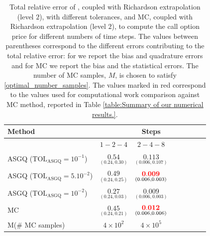 \begin{table}[!h]
	\centering
	\begin{tabular}{l*{6}{c}r}
		\toprule[1.5pt]
	Method & & Steps  & &     \\
	\hline
		        & $1-2-4$ & $2-4-8$  \\
		\hline

		ASGQ ($\text{TOL}_{\text{ASGQ}}=10^{-1}$)  & $\underset{(0.24,0.30)}{\mathbf{ 0.54
		}}$ & $\underset{(0.006,0.107)}{\mathbf{ 0.113}}$ \\
		ASGQ ($\text{TOL}_{\text{ASGQ}}=5.10^{-2}$)  & $\underset{(0.24,0.25)}{\mathbf{   0.49
		}}$ & $\underset{(0.006,0.003)}{\mathbf{ {\color{red}0.009}} }$  \\
		ASGQ ($\text{TOL}_{\text{ASGQ}}=10^{-2}$)  & $\underset{(0.24,0.03)}{\mathbf{ 0.27}}$ & $\underset{(0.006,0.003)}{\mathbf{ 0.009 }}$    \\	

			
				\hline
		MC   & $\underset{(0.24,0.21)}{\mathbf{0.45}}$  & $\underset{(0.006,0.006)}{\mathbf{{\color{red}0.012}}}$    \\
			M(\# MC samples) & $4 \times 10^2$  & $4 \times 10^5$   \\
		\bottomrule[1.25pt]
	\end{tabular}
	\caption{Total relative  error of , coupled with Richardson extrapolation (level $2$), with different tolerances, and MC, coupled with Richardson extrapolation (level $2$), to compute the call option price for different numbers of time steps.  The values between parentheses correspond to the different errors contributing to the total relative error: for  we report the bias and quadrature errors and for MC we report the bias and the statistical errors. The number of MC samples, $M$, is chosen to satisfy \eqref{optimal_number_samples}. The values marked in red correspond to the values used for computational work comparison against MC method, reported in Table \ref{table:Summary of our numerical results.}.}
	\label{Total  error of MISC and MC to compute Call option price of the different tolerances for different number of time steps. Case set $2$ parameters, with Richardson extrapolation(level $2$). The numbers between parentheses are the corresponding absolute errors,linear}
\end{table}
\FloatBarrier

